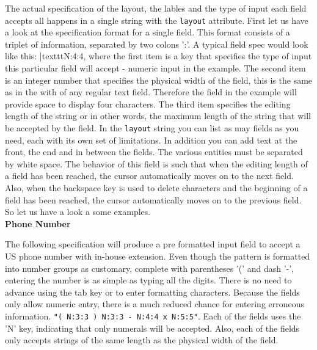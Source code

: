 The actual specification of the layout, the lables and the type of input
each field accepts all happens in a single string with the
\texttt{layout} attribute. First let us have a look at the specification
format for a single field. This format consists of a triplet of
information, separated by two colons ':'. A typical field spec would
look like this: |texttt{N:4:4}, where the first item is a key that
specifies the type of input this particular field will accept - numeric
input in the example. The second item is an integer number that
specifies the physical width of the field, this is the same as in the
with of any regular text field. Therefore the field in the example will
provide space to display four characters. The third item specifies the
editing length of the string or in other words, the maximum length of
the string that will be accepted by the field. In the \texttt{layout}
string you can list as may fields as you need, each with its own set of
limitations. In addition you can add text at the front, the end and in
between the fields. The various entities must be separated by white
space. The behavior of this field is such that when the editing length
of a field has been reached, the cursor automatically moves on to the
next field. Also, when the backspace key is used to delete characters
and the beginning of a field has been reached, the cursor automatically
moves on to the previous field. So let us have a look a some examples.\\

\textbf{Phone Number}

The following specification will produce a pre formatted input field to
accept a US phone number with in-house extension. Even though the
pattern is formatted into number groups as customary, complete with
parentheses '(' and dash '-', entering the number is as simple as typing
all the digits. There is no need to advance using the tab key or to enter
formatting characters. Because the fields only allow numeric entry, there
is a much reduced chance for entering erroneous information.
\texttt{"( N:3:3 ) N:3:3 - N:4:4 x N:5:5"}. Each of the fields uses the
'N' key, indicating that only numerals will be accepted. Also, each of
the fields only accepts strings of the same length as the physical width
of the field.\\

\begin{center}
\end{center}

